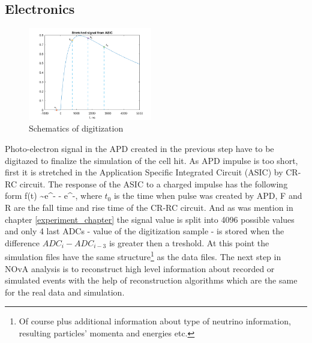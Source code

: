 \subsection{Electronics}
\begin{figure}
\vspace{-20pt}
  \begin{center}
    \includegraphics[width=0.48\textwidth]{figures/digit_scheme.png}
  \end{center}
\vspace{1mm}
\caption{Schematics of digitization}
\end{figure}
Photo-electron signal in the APD created in the previous step have to be digitazed to finalize the simulation
of the cell hit. As APD impulse is too short, first it is stretched in the Application Specific Integrated 
Circuit (ASIC) by CR-RC circuit. The response of the ASIC to a charged impulse has the following form
\be
f(t) \sim e^{-} - e^{-},
\ee
where $t_0$ is the time when pulse was created by APD, F and R are the fall time and rise time of the CR-RC 
circuit. And as was mention in chapter \ref{experiment_chapter} the signal value is split into 4096 possible
values and only 4 last ADCs - value of the digitization sample - is stored when the difference $ADC_i - ADC_{i-3}$
is greater then a treshold. 
At this point the simulation files have the same structure\footnote{Of course plus additional information about type 
of neutrino information, resulting particles' momenta and energies etc.} as the data files.
The next step in NOvA analysis is to reconstruct high level information about recorded or simulated events
with the help of reconstruction algorithms which are the same for the real data and simulation.
